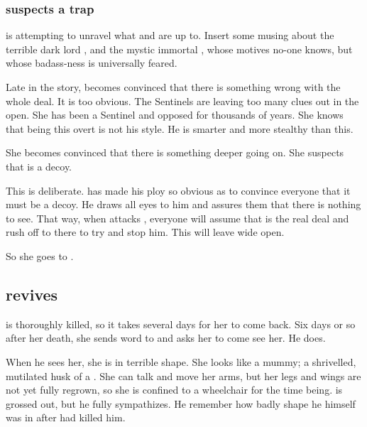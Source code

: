 \subsubsection{\Achsah{} suspects a trap}
\Achsah{} is attempting to unravel what \Ishnaruchaefir{} and \Secherdamon{} are up to. 
Insert some musing about the terrible dark lord \Secherdamon, and the mystic immortal \Ishnaruchaefir, whose motives no-one knows, but whose badass-ness is universally feared. 

Late in the story, \Achsah{} becomes convinced that there is something wrong with the whole \Malcur deal. 
It is too obvious. 
The Sentinels are leaving too many clues out in the open. 
She has been a Sentinel and opposed \Secherdamon{} for thousands of years. 
She knows that being this overt is not his style. 
He is smarter and more stealthy than this. 

She becomes convinced that there is something deeper going on. 
She suspects that \Malcur is a decoy. 

This is deliberate. 
\Secherdamon{} has made his \Malcur ploy so obvious as to convince everyone that it must be a decoy. 
He draws all eyes to him and assures them that there is nothing to see. 
That way, when \Nzessuacrith{} attacks \Forclin, everyone will assume that \Forclin{} is the real deal and rush off to there to try and stop him. 
This will leave \Malcur wide open. 

So she goes to \Forclin. 









\subsection{\Urizeth revives}
\Urizeth{} is thoroughly killed, so it takes several days for her to come back. 
Six days or so after her death, she sends word to \Teshrial{} and asks her to come see her. 
He does. 

When he sees her, she is in terrible shape. 
She looks like a mummy; a shrivelled, mutilated husk of a \resvil. 
She can talk and move her arms, but her legs and wings are not yet fully regrown, so she is confined to a wheelchair for the time being. 
\Teshrial{} is grossed out, but he fully sympathizes. 
He remember how badly shape he himself was in after \Ishnaruchaefir{} had killed him. 

